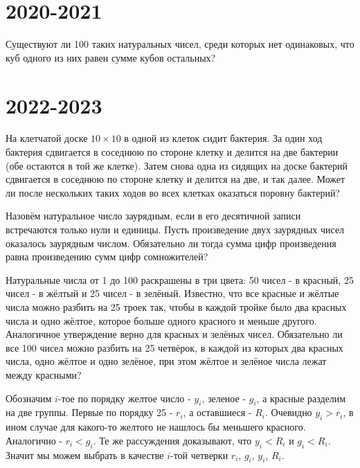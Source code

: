 \documentclass[11pt, a4paper]{template}
\begin{document}
\chapter{2020-2021}

\begin{exercise}
Существуют ли 100 таких натуральных чисел, среди которых нет одинаковых, что куб одного из них равен сумме кубов остальных?
\end{exercise}

\chapter{2022-2023}

\begin{exercise}
На клетчатой доске $10 \times 10$ в одной из клеток сидит бактерия. За один ход бактерия сдвигается в соседнюю по стороне клетку и делится на две бактерии (обе остаются в той же клетке). Затем снова одна из сидящих на доске бактерий сдвигается в соседнюю по стороне клетку и делится на две, и так далее. Может ли после нескольких таких ходов во всех клетках оказаться поровну бактерий?
\end{exercise}

\begin{exercise}
Назовём натуральное число заурядным, если в его десятичной записи встречаются
только нули и единицы. Пусть произведение двух заурядных чисел оказалось заурядным числом. Обязательно ли тогда сумма цифр произведения равна произведению сумм цифр сомножителей?
\end{exercise}

\begin{exercise}
Натуральные числа от 1 до 100 раскрашены в три цвета: 50 чисел - в красный, 25
чисел - в жёлтый и 25 чисел - в зелёный. Известно, что все красные и жёлтые числа можно разбить на 25 троек так, чтобы в каждой тройке было два красных числа и одно жёлтое, которое больше одного красного и меньше другого. Аналогичное утверждение верно для красных и зелёных чисел. Обязательно ли все 100 чисел можно разбить на 25 четвёрок, в каждой из которых два красных числа, одно жёлтое и одно зелёное, при этом жёлтое и зелёное числа лежат между красными?
\end{exercise}

\begin{solution}
Обозначим $i$-тое по порядку желтое число - $y_{i}$, зеленое - $g_{i}$, а красные разделим на две группы. Первые по порядку 25 - $r_{i}$, а оставшиеся - $R_{i}$. Очевидно $y_{i} > r_{i}$, в ином случае для какого-то желтого не нашлось бы меньшего красного. Аналогично - $r_{i} < g_{i}$. Те же рассуждения доказывают, что $y_{i} < R_{i}$ и $g_{i} < R_{i}$. Значит мы можем выбрать в качестве $i$-той четверки $r_{i}$, $g_{i}$, $y_{i}$, $R_{i}$.
\end{solution}
\end{document}
